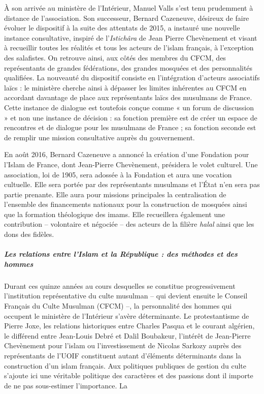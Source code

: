 À son arrivée au ministère de l'Intérieur, Manuel Valls s'est tenu
prudemment à distance de l'association. Son successeur, Bernard
Cazeneuve, désireux de faire évoluer le dispositif à la suite des
attentats de 2015, a instauré une nouvelle instance consultative,
inspiré de l'\emph{Istichâra} de Jean Pierre Chevènement et visant à
recueillir toutes les réalités et tous les acteurs de l'islam français,
à l'exception des salafistes. On retrouve ainsi, aux côtés des membres
du CFCM, des représentants de grandes fédérations, des grandes mosquées
et des personnalités qualifiées. La nouveauté du dispositif consiste en
l'intégration d'acteurs associatifs laïcs : le ministère cherche ainsi à
dépasser les limites inhérentes au CFCM en accordant davantage de place
aux représentants laïcs des musulmans de France. Cette instance de
dialogue est toutefois conçue comme « un forum de discussion » et non
une instance de décision : sa fonction première est de créer un espace
de rencontres et de dialogue pour les musulmans de France ; sa fonction
seconde est de remplir une mission consultative auprès du gouvernement.

En août 2016, Bernard Cazeneuve a annoncé la création d'une Fondation
pour l'Islam de France, dont Jean-Pierre Chevènement, présidera le volet
culturel. Une association, loi de 1905, sera adossée à la Fondation et
aura une vocation cultuelle. Elle sera portée par des représentants
musulmans et l'État n'en sera pas partie prenante. Elle aura pour
missions principales la centralisation de l'ensemble des financements
nationaux pour la construction de mosquées ainsi que la formation
théologique des imams. Elle recueillera également une contribution --
volontaire et négociée -- des acteurs de la filière \emph{halal} ainsi
que les dons des fidèles.


\hypertarget{les-relations-entre-lislam-et-la-ruxe9publique-des-muxe9thodes-et-des-hommes}{%
\subparagraph{Les relations entre l'Islam et la République : des
méthodes et des
hommes}\label{les-relations-entre-lislam-et-la-ruxe9publique-des-muxe9thodes-et-des-hommes}}


Durant ces quinze années au cours desquelles se constitue
progressivement l'institution représentative du culte musulman -- qui
devient ensuite le Conseil Français du Culte Musulman (CFCM) --, la
personnalité des hommes qui occupent le ministère de l'Intérieur s'avère
déterminante. Le protestantisme de Pierre Joxe, les relations
historiques entre Charles Pasqua et le courant algérien, le différend
entre Jean-Louis Debré et Dalil Boubakeur, l'intérêt de Jean-Pierre
Chevènement pour l'islam ou l'investissement de Nicolas Sarkozy auprès
des représentants de l'UOIF constituent autant d'éléments déterminants
dans la construction d'un islam français. Aux politiques publiques de
gestion du culte s'ajoute ici une véritable politique des caractères et
des passions dont il importe de ne pas sous-estimer l'importance. La

